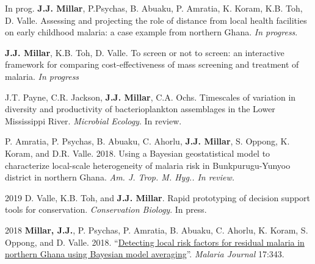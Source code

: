 

\begin{cvskills}

  \cvskill
    {In prog.} %
    {\textbf{J.J. Millar}, P.Psychas, B. Abuaku, P. Amratia, K. Koram, K.B. Toh, D. Valle. Assessing and projecting the role of distance from local health facilities on early childhood malaria: a case example from northern Ghana. \textit{In progress}.} %
  
\cvskill
    {} %
    {\textbf{J.J. Millar}, K.B. Toh, D. Valle. To screen or not to screen: an interactive framework for comparing cost-effectiveness of mass screening and treatment of malaria. \textit{In progress}} %

\cvskill
    {} %
    {J.T. Payne, C.R. Jackson, \textbf{J.J. Millar}, C.A. Ochs. Timescales of variation in diversity and productivity of bacterioplankton assemblages in the Lower Mississippi River. \textit{Microbial Ecology}. In review.} %
    
\cvskill
    {} %
    {P. Amratia, P. Psychas, B. Abuaku, C. Ahorlu, \textbf{J.J. Millar}, S. Oppong, K. Koram, and D.R. Valle. 2018. Using a Bayesian geostatistical model to characterize local-scale heterogeneity of malaria risk in Bunkpurugu-Yunyoo district in northern Ghana. \textit{Am. J. Trop. M. Hyg.. In review.}
} %

  \cvskill
    {2019} %
    {D. Valle, K.B. Toh, and \textbf{J.J. Millar}. Rapid prototyping of decision support tools for conservation. \textit{Conservation Biology}. In press.} %

  \cvskill
    {2018} %
    {\textbf{Millar, J.J.}, P. Psychas, P. Amratia, B. Abuaku, C. Ahorlu, K. Koram, S. Oppong, and D. Valle. 2018. “\href{https://malariajournal.biomedcentral.com/articles/10.1186/s12936-018-2491-2}{Detecting local risk factors for residual malaria in northern Ghana using Bayesian model averaging}”. \textit{Malaria Journal} 17:343.} 


\end{cvskills}
